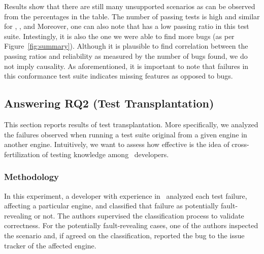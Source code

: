 \documentclass[smallextended]{svjour3}
\begin{document}
Results show that there are still many unsupported scenarios as can be observed from the
percentages in the table. The number of passing tests is high and
similar for \jsc, \veight, and \smonkey
Moreover, one can also note that \chakra has a low passing ratio
in this test suite. Intestingly, it is also the one we were able to find more bugs (as per
Figure~\ref{fig:summary}). Although it is plausible to find
correlation between the passing ratios and reliability as measured by
the number of bugs found, we do not imply causality. As aforementioned,
it is important
to note that failures in this conformance test suite indicates missing
features as opposed to bugs.

\begin{center}
\end{center}


\subsection{Answering RQ2 (Test Transplantation)}
\label{sec:transplantation}

This section reports results of test transplantation. More
specifically, we analyzed the failures observed when running a test
suite original from a given engine in another engine. Intuitively, we
want to assess how effective is the idea of cross-fertilization of
testing knowledge among \js\ developers.

\subsubsection{Methodology}
\label{sec:methodology}
In this experiment, a developer with experience in \js\ analyzed each
test failure, affecting a particular engine, and classified that
failure as potentially fault-revealing or not. The authors supervised
the classification process to validate correctness. For the
potentially fault-revealing cases, one of the authors inspected the
scenario and, if agreed on the classification, reported the bug to the
issue tracker of the affected engine.
\end{document}
